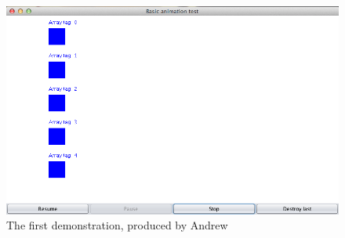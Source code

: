 \begin{figure}
\begin{center}
\includegraphics[width=\textwidth]{images/firstPrototype.png}
\end{center}
\caption{The first demonstration, produced by Andrew}
\label{fig:firstPrototype}
\end{figure}